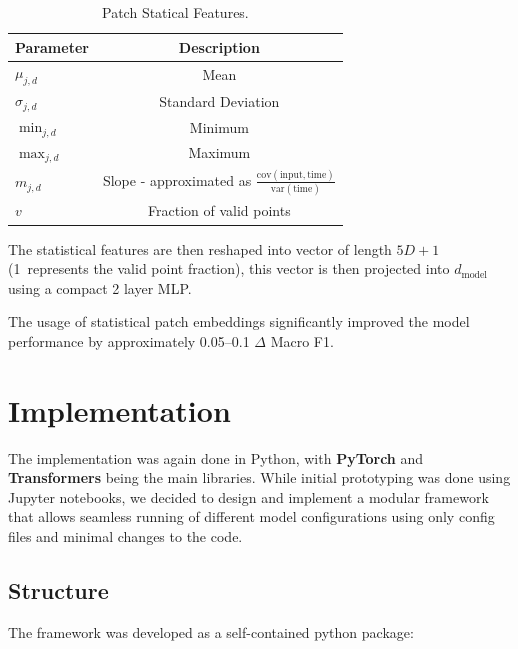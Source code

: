 \begin{table}[H]
    \centering
    \small
    \renewcommand{\arraystretch}{1.3}
    \begin{tabularx}{\textwidth}{X c}
        \toprule
        \textbf{Parameter} & \textbf{Description} \tabularnewline
        \midrule
        $\mu_{j,d}$ & Mean \tabularnewline
        $\sigma_{j,d}$ & Standard Deviation \tabularnewline
        $\min_{j,d}$ & Minimum \tabularnewline
        $\max_{j,d}$ & Maximum \tabularnewline
        $m_{j,d}$ & Slope - approximated as $\frac{\mathrm{cov(input,time)}}{\mathrm{var(time)}}$ \tabularnewline
        $v$ & Fraction of valid points \tabularnewline
        \bottomrule
    \end{tabularx}
    \caption[Patch Statical Features]{Patch Statical Features.}
    \label{tab:06_patch_statistical_featues}
\end{table}

The statistical features are then reshaped into vector of length $5D + 1$ (1~represents the valid point fraction), this vector is then projected into $d_{\mathrm{model}}$ using a compact 2 layer MLP.

The usage of statistical patch embeddings significantly improved the model performance by approximately 0.05--0.1 $\Delta$ Macro F1.


\section{Implementation}

The implementation was again done in Python, with \textbf{PyTorch} and \textbf{Transformers} being the main libraries.
While initial prototyping was done using Jupyter notebooks, we decided to design and implement a modular framework that allows seamless running of different model configurations using only config files and minimal changes to the code.

\subsection{Structure}

The framework was developed as a self-contained python package:



